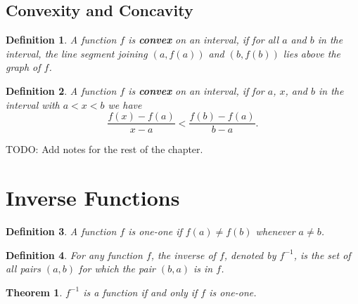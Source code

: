 \documentclass{article}
\numberwithin{corollary}{subsection}
\newtheorem{definition}{Definition}
\numberwithin{definition}{subsection}
\numberwithin{lemma}{subsection}
\newtheorem{theorem}{Theorem}
\numberwithin{theorem}{subsection}
\begin{document}
\subsection{Convexity and Concavity}

\begin{definition}
  A function $f$ is \textbf{convex} on an interval, if for all $a$ and $b$ in
  the interval, the line segment joining $(a, f(a))$ and $(b, f(b))$ lies above
  the graph of $f$.
\end{definition}

\begin{definition}
  A function $f$ is \textbf{convex} on an interval, if for $a$, $x$, and $b$ in
  the interval with $a < x < b$ we have \[
    \frac{f(x) - f(a)}{x - a} < \frac{f(b) - f(a)}{b - a}.
  \]
\end{definition}

TODO: Add notes for the rest of the chapter.

\section{Inverse Functions}

\begin{definition}
  A function $f$ is \emph{one-one} if $f(a) \neq f(b)$ whenever $a \neq b$.
\end{definition}

\begin{definition}
  For any function $f$, the \emph{inverse} of $f$, denoted by $f^{-1}$, is the
  set of all pairs $(a, b)$ for which the pair $(b, a)$ is in $f$.
\end{definition}

\begin{theorem}
  $f^{-1}$ is a function if and only if $f$ is one-one.
\end{theorem}
\end{document}
